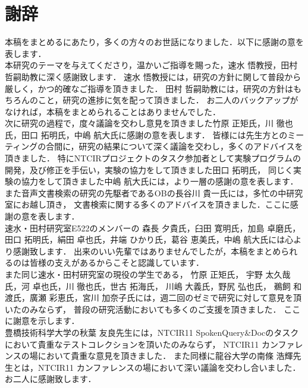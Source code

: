 \chapter*{謝辞}
本稿をまとめるにあたり，多くの方々のお世話になりました．以下に感謝の意を表します．\\

本研究のテーマを与えてくださり，温かいご指導を賜った，速水 悟教授，田村 哲嗣助教に深く感謝致します．
速水 悟教授には，研究の方針に関して普段から厳しく，かつ的確なご指導を頂きました．
田村 哲嗣助教には，研究の方針はもちろんのこと，研究の進捗に気を配って頂きました．
お二人のバックアップがなければ，本稿をまとめられることはありませんでした．\\

次に研究の過程で，度々議論を交わし意見を頂きました竹原 正矩氏，川 徹也氏，田口 拓明氏，中嶋 航大氏に感謝の意を表します．
皆様には先生方とのミーティングの合間に，研究の結果について深く議論を交わし，多くのアドバイスを頂きました．
特にNTCIRプロジェクトのタスク参加者として実験プログラムの開発，及び修正を手伝い，実験の協力をして頂きました田口 拓明氏，
同じく実験の協力をして頂きました中嶋 航大氏には，より一層の感謝の意を表します．
また音声文書検索の研究の先駆者であるOBの長谷川 貴一氏には，多忙の中研究室にお越し頂き，
文書検索に関する多くのアドバイスを頂きました．ここに感謝の意を表します．\\

速水・田村研究室E522のメンバーの
森長 夕貴氏，臼田 寛明氏，加島 卓磨氏，田口 拓明氏，絹田 卓也氏，井端 ひかり氏，葛谷 恵美氏，中嶋 航大氏には心より感謝致します．
出来のいい先輩ではありませんでしたが，本稿をまとめられるのは皆様の支えがあるからこそと認識しています．\\
また同じ速水・田村研究室の現役の学生である，
竹原 正矩氏，
宇野 太久哉氏，河 卓也氏，川 徹也氏，世古 拓海氏， 川嶋 大義氏，野尻 弘也氏，
鵜飼 和渡氏，廣瀬 彩恵氏，宮川 加奈子氏には，週二回のゼミで研究に対して意見を頂いたのみならず，
普段の研究活動においても多くのご支援を頂きました．
ここに謝意を示します．\\

豊橋技術科学大学の秋葉 友良先生には，NTCIR11 SpokenQuery\&Docのタスクにおいて貴重なテストコレクションを頂いたのみならず，
NTCIR11 カンファレンスの場において貴重な意見を頂きました．
また同様に龍谷大学の南條 浩輝先生とは，NTCIR11 カンファレンスの場において深い議論を交わし合いました．
お二人に感謝致します．\\

